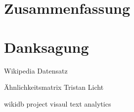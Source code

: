 \chapter{Zusammenfassung}
\label{chap:Zusammenfassung}


\cleardoublepage
\clearpage



\newpage
\let\cleardoublepage\clearpage
\chapter*{Danksagung}

Wikipedia Datensatz

Ähnlichkeitsmatrix Tristan Licht

wikidb project visaul text analytics









%

\printbibliography



% 
% 




